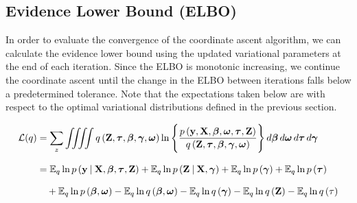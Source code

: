 \documentclass[twoside,11pt]{article}
\newcommand\given[1][]{\:#1\vert\:}
\newcommand{\boldbeta}{\boldsymbol\beta}
\newcommand{\boldgamma}{\boldsymbol\gamma}
\newcommand{\boldomega}{\boldsymbol\omega}
\newcommand{\boldtau}{\boldsymbol\tau}
\newcommand{\E}{\mathbb{E}}
\begin{document}
\newpage

\subsection{Evidence Lower Bound (ELBO)}
In order to evaluate the convergence of the coordinate ascent algorithm, we can calculate the evidence lower bound using the updated variational parameters at the end of each iteration. Since the ELBO is monotonic increasing, we continue the coordinate ascent until the change in the ELBO between iterations falls below a predetermined tolerance. Note that the expectations taken below are with respect to the optimal variational distributions defined in the previous section.

\begin{equation} \label{eq:ELBO}
\setlength{\jot}{11pt}
\begin{split}
	\mathcal{L}(q) &= \sum_{z} \iiiint q\left(\mathbf{Z}, \boldtau, \boldbeta, \boldgamma, \boldsymbol \omega\right)
	\ln \Bigg\{ \frac{p\left(\mathbf{y}, \mathbf{X}, \boldbeta, \boldsymbol\omega, \boldtau, \mathbf{Z}\right)}{q \left(\mathbf{Z}, \boldtau, \boldbeta, \boldgamma, \boldsymbol \omega \right)}\Bigg\}\, d\boldbeta\, d\boldsymbol\omega\, d\boldtau\, d\boldgamma \\
	&= \E_q \ln p\left( \mathbf{y} \given \mathbf{X}, \boldbeta, \boldtau, \mathbf{Z} \right) + \E_q \ln p\left( \mathbf{Z} \given \mathbf{X}, \boldgamma \right) + \E_q \ln p\left( \boldgamma \right) + \E_q \ln p\left( \boldtau \right) \\ & \quad + \E_q \ln p\left( \boldbeta, \boldomega \right) - \E_q \ln q\left( \boldbeta, \boldomega \right) - 
	\E_q \ln q\left( \boldgamma \right) - \E_q \ln q\left( \mathbf{Z} \right) - \E_q \ln q\left( \mathbf{\tau} \right)
\end{split}
\end{equation}
\end{document}
